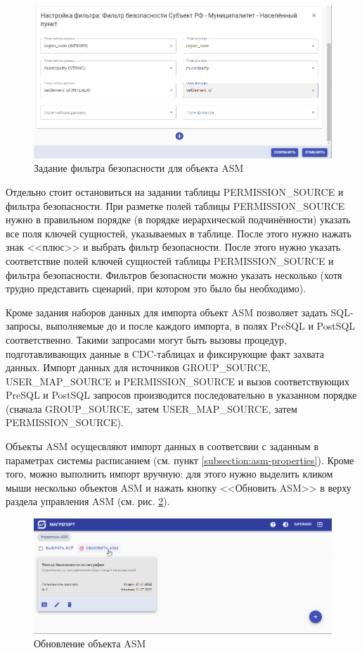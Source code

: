\documentclass[../user-manual.tex]{subfiles}
\begin{document}
	\begin{figure}[h]
		\centering
		\includegraphics[width=\graphicswidth]{img/22-asm-permission-source-2.png}
		\caption{Задание фильтра безопасности для объекта ASM}
		\label{fig:asm-permission-source-2}
	\end{figure}

	Отдельно стоит остановиться на задании таблицы PERMISSION\_SOURCE и фильтра безопасности. При разметке полей таблицы PERMISSION\_SOURCE нужно в правильном порядке (в порядке иерархической подчинённости) указать все поля ключей сущностей, указываемых в таблице. После этого нужно нажать знак <<плюс>> и выбрать фильтр безопасности. После этого нужно указать соответствие полей ключей сущностей таблицы PERMISSION\_SOURCE и фильтра безопасности. Фильтров безопасности можно указать несколько (хотя трудно представить сценарий, при котором это было бы необходимо).
	
	Кроме задания наборов данных для импорта объект ASM позволяет задать SQL-запросы, выполняемые до и после каждого импорта, в полях PreSQL и PostSQL соответственно. Такими запросами могут быть вызовы процедур, подготавливающих данные в CDC-таблицах и фиксирующие факт захвата данных. Импорт данных для источников GROUP\_SOURCE, USER\_MAP\_SOURCE и PERMISSION\_SOURCE и вызов соответствующих PreSQL и PostSQL запросов производится последовательно в указанном порядке (сначала GROUP\_SOURCE, затем USER\_MAP\_SOURCE, затем PERMISSION\_SOURCE).
	
	Объекты ASM осущесвляют импорт данных в соответсвии с заданным в параметрах системы расписанием (см. пункт \ref{subsection:asm-properties}). Кроме того, можно выполнить импорт вручную: для этого нужно выделить кликом мыши несколько объектов ASM и нажать кнопку <<Обновить ASM>> в верху раздела управления ASM (см. рис. \ref{fig:asm-update}).
	
	\begin{figure}[h]
		\centering
		\includegraphics[width=\graphicswidth]{img/23-asm-update.png}
		\caption{Обновление объекта ASM}
		\label{fig:asm-update}
	\end{figure}	
\end{document}
